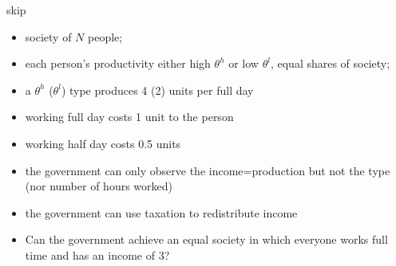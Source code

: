\documentclass[english,handout]{beamer}		%
\def\lyxframeend{} %
\newcommand\soutred{\bgroup\markoverwith
	{\textcolor{red}{\rule[0.55ex]{2pt}{0.8pt}}}\ULon}
\begin{document}
\lyxframeend


\begin{example}[skip]
	skip
\end{example}
\lyxframeend


\begin{example}[Communism]
	\begin{itemize}
		\item society of $N$ people;
		\item each person's productivity either high $\theta^h$ or low $\theta^l$, equal shares of society;
		\item a $\theta^{h}$ ($\theta^{l}$) type produces 4 (2) units per full day
		\item working full day costs 1 unit to the person
		\item working half day costs 0.5 units
		\item the government can only observe the income=production but not the type (nor number of hours worked)
		\item the government can use taxation to redistribute income
		\item Can the government achieve an equal society in which everyone works full time and has an income of 3?
	\end{itemize}
\end{example}
\vspace{-2em}
\lyxframeend
\end{document}
